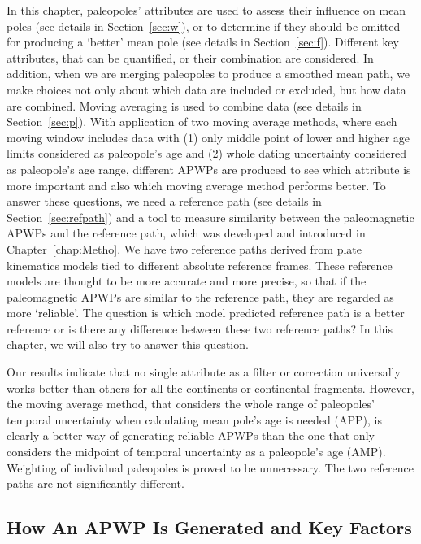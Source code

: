 In this chapter, paleopoles' attributes are used to assess their influence on
mean poles (see details in Section~\ref{sec:w}), or to determine if they should
be omitted for producing a `better' mean pole (see details in
Section~\ref{sec:f}). Different key attributes, that can be quantified, or their
combination are considered. In addition, when we are merging paleopoles to
produce a smoothed mean path, we make choices not only about which data are
included or excluded, but how data are combined. Moving averaging is used to
combine data (see details in Section~\ref{sec:p}). With application of two
moving average methods, where each moving window includes data with (1) only
middle point of lower and higher age limits considered as paleopole's age and
(2) whole dating uncertainty considered as paleopole's age range, different
APWPs are produced to see which attribute is more important and also which
moving average method performs better. To answer these questions, we need a
reference path (see details in Section~\ref{sec:refpath}) and a tool to measure
similarity between the paleomagnetic APWPs and the reference path, which was
developed and introduced in Chapter~\ref{chap:Metho}. We have two reference
paths derived from plate kinematics models tied to different absolute reference
frames. These reference models are thought to be more accurate and more precise,
so that if the paleomagnetic APWPs are similar to the reference path, they are
regarded as more `reliable'. The question is which model predicted reference
path is a better reference or is there any difference between these two
reference paths? In this chapter, we will also try to answer this question.

Our results indicate that no single attribute as a filter or correction
universally works better than others for all the continents or continental
fragments. However, the moving average method, that considers the whole range of
paleopoles' temporal uncertainty when calculating mean pole's age is needed
(APP), is clearly a better way of generating reliable APWPs than the one that
only considers the midpoint of temporal uncertainty as a paleopole's age (AMP).
Weighting of individual paleopoles is proved to be unnecessary. The two
reference paths are not significantly different.

\subsection{How An APWP Is Generated and Key Factors}

